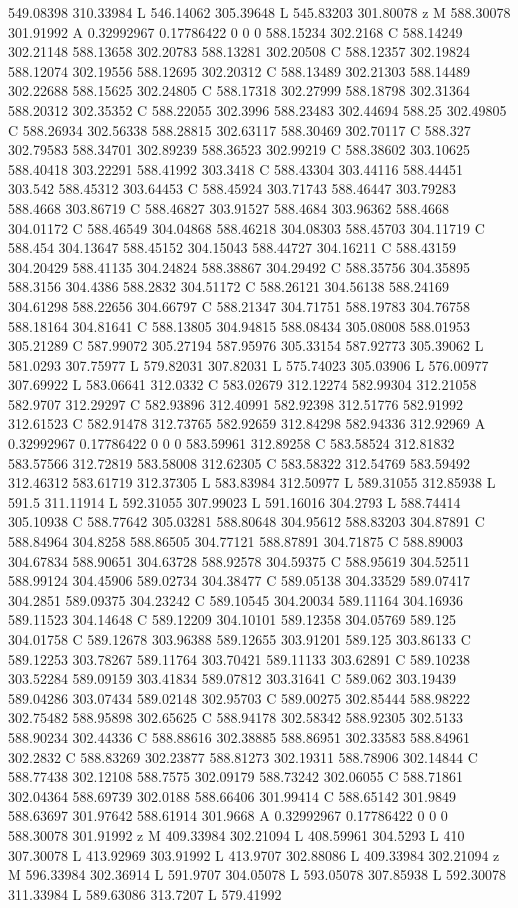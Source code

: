 {\begin{scope}[local bounding box=bb]
{549.08398 310.33984 L 546.14062 305.39648 L 545.83203 301.80078 z M 588.30078 301.91992 A 0.32992967 0.17786422 0 0 0 588.15234 302.2168 C 588.14249 302.21148 588.13658 302.20783 588.13281 302.20508 C 588.12357 302.19824 588.12074 302.19556 588.12695 302.20312 C 588.13489 302.21303 588.14489 302.22688 588.15625 302.24805 C 588.17318 302.27999 588.18798 302.31364 588.20312 302.35352 C 588.22055 302.3996 588.23483 302.44694 588.25 302.49805 C 588.26934 302.56338 588.28815 302.63117 588.30469 302.70117 C 588.327 302.79583 588.34701 302.89239 588.36523 302.99219 C 588.38602 303.10625 588.40418 303.22291 588.41992 303.3418 C 588.43304 303.44116 588.44451 303.542 588.45312 303.64453 C 588.45924 303.71743 588.46447 303.79283 588.4668 303.86719 C 588.46827 303.91527 588.4684 303.96362 588.4668 304.01172 C 588.46549 304.04868 588.46218 304.08303 588.45703 304.11719 C 588.454 304.13647 588.45152 304.15043 588.44727 304.16211 C 588.43159 304.20429 588.41135 304.24824 588.38867 304.29492 C 588.35756 304.35895 588.3156 304.4386 588.2832 304.51172 C 588.26121 304.56138 588.24169 304.61298 588.22656 304.66797 C 588.21347 304.71751 588.19783 304.76758 588.18164 304.81641 C 588.13805 304.94815 588.08434 305.08008 588.01953 305.21289 C 587.99072 305.27194 587.95976 305.33154 587.92773 305.39062 L 581.0293 307.75977 L 579.82031 307.82031 L 575.74023 305.03906 L 576.00977 307.69922 L 583.06641 312.0332 C 583.02679 312.12274 582.99304 312.21058 582.9707 312.29297 C 582.93896 312.40991 582.92398 312.51776 582.91992 312.61523 C 582.91478 312.73765 582.92659 312.84298 582.94336 312.92969 A 0.32992967 0.17786422 0 0 0 583.59961 312.89258 C 583.58524 312.81832 583.57566 312.72819 583.58008 312.62305 C 583.58322 312.54769 583.59492 312.46312 583.61719 312.37305 L 583.83984 312.50977 L 589.31055 312.85938 L 591.5 311.11914 L 592.31055 307.99023 L 591.16016 304.2793 L 588.74414 305.10938 C 588.77642 305.03281 588.80648 304.95612 588.83203 304.87891 C 588.84964 304.8258 588.86505 304.77121 588.87891 304.71875 C 588.89003 304.67834 588.90651 304.63728 588.92578 304.59375 C 588.95619 304.52511 588.99124 304.45906 589.02734 304.38477 C 589.05138 304.33529 589.07417 304.2851 589.09375 304.23242 C 589.10545 304.20034 589.11164 304.16936 589.11523 304.14648 C 589.12209 304.10101 589.12358 304.05769 589.125 304.01758 C 589.12678 303.96388 589.12655 303.91201 589.125 303.86133 C 589.12253 303.78267 589.11764 303.70421 589.11133 303.62891 C 589.10238 303.52284 589.09159 303.41834 589.07812 303.31641 C 589.062 303.19439 589.04286 303.07434 589.02148 302.95703 C 589.00275 302.85444 588.98222 302.75482 588.95898 302.65625 C 588.94178 302.58342 588.92305 302.5133 588.90234 302.44336 C 588.88616 302.38885 588.86951 302.33583 588.84961 302.2832 C 588.83269 302.23877 588.81273 302.19311 588.78906 302.14844 C 588.77438 302.12108 588.7575 302.09179 588.73242 302.06055 C 588.71861 302.04364 588.69739 302.0188 588.66406 301.99414 C 588.65142 301.9849 588.63697 301.97642 588.61914 301.9668 A 0.32992967 0.17786422 0 0 0 588.30078 301.91992 z M 409.33984 302.21094 L 408.59961 304.5293 L 410 307.30078 L 413.92969 303.91992 L 413.9707 302.88086 L 409.33984 302.21094 z M 596.33984 302.36914 L 591.9707 304.05078 L 593.05078 307.85938 L 592.30078 311.33984 L 589.63086 313.7207 L 579.41992 }
\end{scope}}
